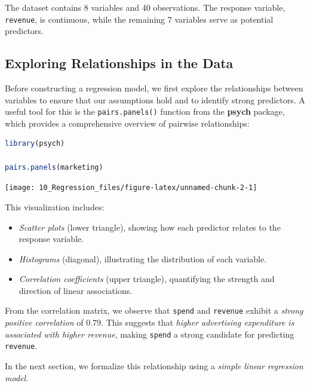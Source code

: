\documentclass[
  11pt,
]{book}
\newcommand{\passthrough}[1]{#1}
\providecommand{\tightlist}{%
  \setlength{\itemsep}{0pt}\setlength{\parskip}{0pt}}
\theoremstyle{definition}
\theoremstyle{definition}
\theoremstyle{definition}
\theoremstyle{definition}
\theoremstyle{remark}
\begin{document}
The dataset contains 8 variables and 40 observations. The response variable, \passthrough{\lstinline!revenue!}, is continuous, while the remaining 7 variables serve as potential predictors.

\subsection*{Exploring Relationships in the Data}\label{exploring-relationships-in-the-data}


Before constructing a regression model, we first explore the relationships between variables to ensure that our assumptions hold and to identify strong predictors. A useful tool for this is the \passthrough{\lstinline!pairs.panels()!} function from the \textbf{psych} package, which provides a comprehensive overview of pairwise relationships:

\begin{lstlisting}[language=R]
library(psych)

pairs.panels(marketing)
\end{lstlisting}

\begin{center}\texttt{[image: 10\_Regression\_files/figure-latex/unnamed-chunk-2-1]} \end{center}

This visualization includes:

\begin{itemize}
\tightlist
\item
  \emph{Scatter plots} (lower triangle), showing how each predictor relates to the response variable.\\
\item
  \emph{Histograms} (diagonal), illustrating the distribution of each variable.\\
\item
  \emph{Correlation coefficients} (upper triangle), quantifying the strength and direction of linear associations.
\end{itemize}

From the correlation matrix, we observe that \passthrough{\lstinline!spend!} and \passthrough{\lstinline!revenue!} exhibit a \emph{strong positive correlation} of 0.79. This suggests that \emph{higher advertising expenditure is associated with higher revenue}, making \passthrough{\lstinline!spend!} a strong candidate for predicting \passthrough{\lstinline!revenue!}.

In the next section, we formalize this relationship using a \emph{simple linear regression model}.
\end{document}
